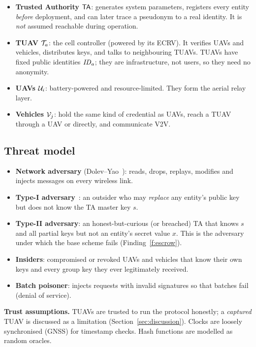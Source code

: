 \begin{itemize}
  \item \textbf{\textcolor{deep}{Trusted Authority $\mathsf{TA}$}}: generates system parameters, registers every entity \emph{before} deployment, and can
        later trace a pseudonym to a real identity. It is \emph{not} assumed reachable during operation.
  \item \textbf{\textcolor{hoc}{TUAV $\mathcal{T}_a$}}: the cell controller (powered by its ECRV). It verifies UAVs and vehicles, distributes keys, and talks to
        neighbouring TUAVs. TUAVs have fixed public identities $\mathit{ID}_a$; they are infrastructure, not users, so they need no anonymity.
  \item \textbf{\textcolor{uavc}{UAVs $\mathcal{U}_i$}}: battery-powered and resource-limited. They form the aerial relay layer.
  \item \textbf{\textcolor{vehc}{Vehicles $\mathcal{V}_j$}}: hold the same kind of credential as UAVs, reach a TUAV through a UAV or directly, and communicate V2V.
\end{itemize}

\subsection{Threat model}
\begin{itemize}
  \item \textbf{Network adversary} (Dolev--Yao~\cite{dolevyao}): reads, drops, replays, modifies and injects messages on every wireless link.
  \item \textbf{Type-I adversary}~\cite{alriyami}: an outsider who may \emph{replace} any entity's public key but does not know the TA master key $s$.
  \item \textbf{Type-II adversary}: an honest-but-curious (or breached) TA that knows $s$ and all partial keys but not an entity's secret value $x$.
        This is the adversary under which the base scheme fails (Finding~\ref{f:escrow}).
  \item \textbf{Insiders}: compromised or revoked UAVs and vehicles that know their own keys and every group key they ever legitimately received.
  \item \textbf{Batch poisoner}: injects requests with invalid signatures so that batches fail (denial of service).
\end{itemize}
\textbf{Trust assumptions.} TUAVs are trusted to run the protocol honestly; a \emph{captured} TUAV is discussed as a limitation
(Section~\ref{sec:discussion}). Clocks are loosely synchronised (GNSS) for timestamp checks. Hash functions are modelled as random oracles.

